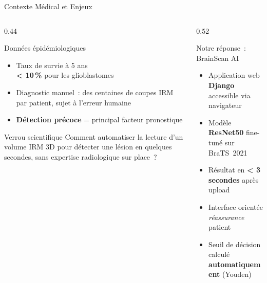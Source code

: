 \documentclass[aspectratio=169, 12pt, compress]{beamer}
\newcommand{\cmark}{\textcolor{EMSIgreen}{\ding{51}}}
\begin{document}
\begin{frame}{Contexte Médical et Enjeux}

  \begin{columns}[T]

    \begin{column}{0.44\textwidth}
      \begin{alertblock}{Données épidémiologiques}
        \begin{itemize}
          \item Taux de survie à 5 ans\\
                \textbf{< 10\,\%} pour les glioblastomes
          \item Diagnostic manuel~: des centaines de coupes
                IRM par patient, sujet à l'erreur humaine
          \item \textbf{Détection précoce} = principal
                facteur pronostique
        \end{itemize}
      \end{alertblock}

      \vspace{6pt}

      \begin{block}{Verrou scientifique}
        Comment automatiser la lecture d'un volume IRM
        3D pour détecter une lésion en quelques secondes,
        sans expertise radiologique sur place~?
      \end{block}
    \end{column}

    \begin{column}{0.52\textwidth}
      \begin{exampleblock}{Notre réponse~: BrainScan AI}
        \begin{itemize}
          \item[\cmark] Application web \textbf{Django}
                        accessible via navigateur
          \item[\cmark] Modèle \textbf{ResNet50} fine-tuné
                        sur BraTS~2021
          \item[\cmark] Résultat en \textbf{< 3 secondes}
                        après upload
          \item[\cmark] Interface orientée
                        \textit{réassurance} patient
          \item[\cmark] Seuil de décision calculé
                        \textbf{automatiquement} (Youden)
        \end{itemize}
      \end{exampleblock}


\end{column}
\end{columns}
\end{frame}
\end{document}
